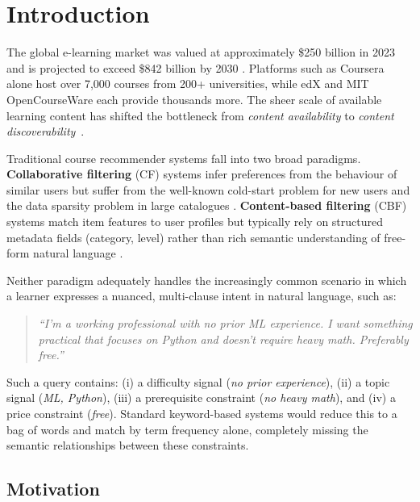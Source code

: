 \documentclass[12pt, a4paper]{article}
\begin{document}
\tableofcontents
\newpage

\section{Introduction}
\label{sec:introduction}

The global e-learning market was valued at approximately \$250 billion in 2023 and is projected to
exceed \$842 billion by 2030 \cite{globalElearning2023}. Platforms such as Coursera alone host
over 7,000 courses from 200+ universities, while edX and MIT OpenCourseWare each provide thousands
more. The sheer scale of available learning content has shifted the bottleneck from \textit{content
availability} to \textit{content discoverability}~\cite{burke2002hybrid}.

Traditional course recommender systems fall into two broad paradigms. \textbf{Collaborative
filtering} (CF) systems infer preferences from the behaviour of similar users but suffer from the
well-known cold-start problem for new users and the data sparsity problem in large catalogues
\cite{sarwar2001item}. \textbf{Content-based filtering} (CBF) systems match item features to user
profiles but typically rely on structured metadata fields (category, level) rather than rich
semantic understanding of free-form natural language \cite{pazzani2007content}.

Neither paradigm adequately handles the increasingly common scenario in which a learner expresses
a nuanced, multi-clause intent in natural language, such as:

\begin{quote}
\itshape
``I'm a working professional with no prior ML experience. I want something practical that focuses
on Python and doesn't require heavy math. Preferably free.''
\end{quote}

Such a query contains: (i) a difficulty signal (\textit{no prior experience}), (ii) a topic
signal (\textit{ML, Python}), (iii) a prerequisite constraint (\textit{no heavy math}), and (iv)
a price constraint (\textit{free}). Standard keyword-based systems would reduce this to a bag of
words and match by term frequency alone, completely missing the semantic relationships between
these constraints.

\subsection{Motivation}
\end{document}
